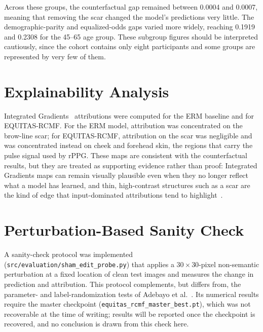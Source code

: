 Across these groups, the counterfactual gap remained between 0.0004 and 0.0007, meaning that removing the scar changed the model's predictions very little. The demographic-parity and equalized-odds gaps varied more widely, reaching 0.1919 and 0.2308 for the 45--65 age group. These subgroup figures should be interpreted cautiously, since the cohort contains only eight participants and some groups are represented by very few of them.


\section{Explainability Analysis}
Integrated Gradients~\cite{sundararajan2017} attributions were computed for the ERM baseline and for EQUITAS-RCMF. For the ERM model, attribution was concentrated on the brow-line scar; for EQUITAS-RCMF, attribution on the scar was negligible and was concentrated instead on cheek and forehead skin, the regions that carry the pulse signal used by rPPG. These maps are consistent with the counterfactual results, but they are treated as supporting evidence rather than proof: Integrated Gradients maps can remain visually plausible even when they no longer reflect what a model has learned, and thin, high-contrast structures such as a scar are the kind of edge that input-dominated attributions tend to highlight~\cite{adebayo2018}.

\section{Perturbation-Based Sanity Check}
A sanity-check protocol was implemented (\texttt{src/evaluation/sham\_edit\_probe.py}) that applies a $30 \times 30$-pixel non-semantic perturbation at a fixed location of clean test images and measures the change in prediction and attribution. This protocol complements, but differs from, the parameter- and label-randomization tests of Adebayo et al.~\cite{adebayo2018}. Its numerical results require the master checkpoint (\texttt{equitas\_rcmf\_master\_best.pt}), which was not recoverable at the time of writing; results will be reported once the checkpoint is recovered, and no conclusion is drawn from this check here.

